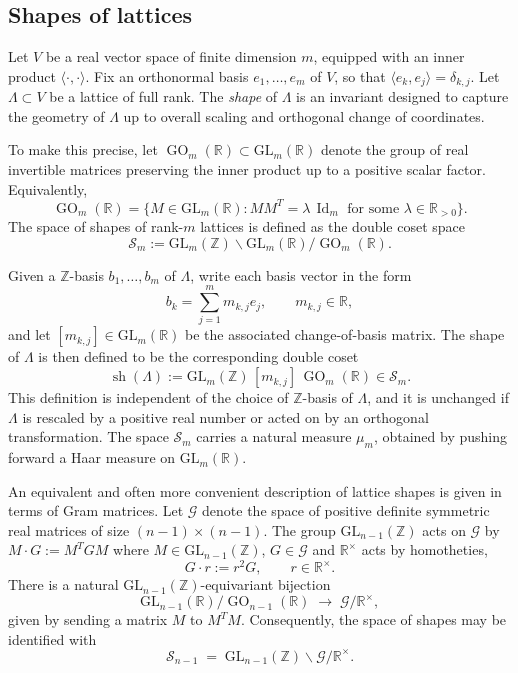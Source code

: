\documentclass{amsart}
\newcommand{\op}[1]{\operatorname{#1}}
\newcommand{\R}{\mathbb{R}}
\newcommand{\Z}{\mathbb{Z}}
\newcommand{\GL}{\mathrm{GL}}
\theoremstyle{plain}
\theoremstyle{definition}
\theoremstyle{remark}
\numberwithin{equation}{section}
\begin{document}
\subsection{Shapes of lattices}

Let $V$ be a real vector space of finite dimension $m$, equipped with an inner product $\langle \cdot,\cdot\rangle$. Fix an orthonormal basis $e_1,\dots,e_m$ of $V$, so that $\langle e_k,e_j\rangle=\delta_{k,j}$. Let $\Lambda\subset V$ be a lattice of full rank. The \emph{shape} of $\Lambda$ is an invariant designed to capture the geometry of $\Lambda$ up to overall scaling and orthogonal change of coordinates.

To make this precise, let $\op{GO}_m(\R)\subset \GL_m(\R)$ denote the group of real invertible matrices preserving the inner product up to a positive scalar factor. Equivalently,
\[
\op{GO}_m(\R)=\{M\in \GL_m(\R): MM^T=\lambda\,\op{Id}_m \text{ for some }\lambda\in\R_{>0}\}.
\]
The space of shapes of rank-$m$ lattices is defined as the double coset space
\[
\mathcal S_m := \GL_m(\Z)\backslash \GL_m(\R)/\op{GO}_m(\R).
\]

Given a $\Z$-basis $b_1,\dots,b_m$ of $\Lambda$, write each basis vector in the form
\[
b_k=\sum_{j=1}^m m_{k,j} e_j,\qquad m_{k,j}\in\R,
\]
and let $[m_{k,j}]\in \GL_m(\R)$ be the associated change-of-basis matrix. The shape of $\Lambda$ is then defined to be the corresponding double coset
\[
\op{sh}(\Lambda):=\GL_m(\Z)\,[m_{k,j}]\,\op{GO}_m(\R)\in\mathcal S_m.
\]
This definition is independent of the choice of $\Z$-basis of $\Lambda$, and it is unchanged if $\Lambda$ is rescaled by a positive real number or acted on by an orthogonal transformation. The space $\mathcal S_m$ carries a natural measure $\mu_m$, obtained by pushing forward a Haar measure on $\GL_m(\R)$.

\par
An equivalent and often more convenient description of lattice shapes is given in terms of Gram matrices. Let $\mathcal G$ denote the space of positive definite symmetric real matrices of size $(n-1)\times(n-1)$. The group $\GL_{n-1}(\Z)$ acts on $\mathcal G$ by $M\cdot G := M^T G M$ where $M\in \GL_{n-1}(\Z)$, $G\in \mathcal G$ and $\R^\times$ acts by homotheties,
\[
G\cdot r := r^2 G,\qquad r\in \R^\times.
\]
There is a natural $\GL_{n-1}(\Z)$-equivariant bijection
\[
\GL_{n-1}(\R)/\op{GO}_{n-1}(\R)\;\longrightarrow\; \mathcal G/\R^\times,
\]
given by sending a matrix $M$ to $M^TM$. Consequently, the space of shapes may be identified with
\begin{equation}\label{new interpretation}
\mathcal S_{n-1}
\;=\;
\GL_{n-1}(\Z)\backslash \mathcal G/\R^\times.
\end{equation}
\end{document}
